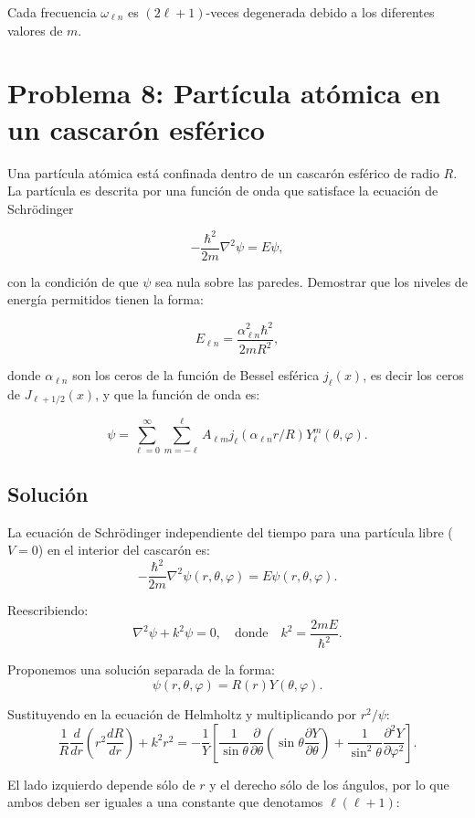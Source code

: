 \documentclass[a4paper]{article}
\begin{document}
Cada frecuencia $\omega_{\ell n}$ es $(2\ell+1)$-veces degenerada debido a los diferentes valores de $m$.


\section{Problema 8: Partícula atómica en un cascarón esférico}

Una partícula atómica está confinada dentro de un cascarón esférico de radio $R$. La partícula es descrita por una función de onda que satisface la ecuación de Schrödinger


$$-\frac{\hbar^2}{2m}\nabla^2\psi = E\psi,$$


con la condición de que $\psi$ sea nula sobre las paredes. Demostrar que los niveles de energía permitidos tienen la forma:


$$E_{\ell n} = \frac{\alpha_{\ell n}^2\hbar^2}{2mR^2},$$


donde $\alpha_{\ell n}$ son los ceros de la función de Bessel esférica $j_\ell(x)$, es decir los ceros de $J_{\ell+1/2}(x)$, y que la función de onda es:


$$\psi = \sum_{\ell=0}^{\infty}\sum_{m=-\ell}^{\ell} A_{\ell m} j_\ell(\alpha_{\ell n}r/R) Y_{\ell}^m(\theta, \varphi).$$


\subsection{Solución}

La ecuación de Schrödinger independiente del tiempo para una partícula libre ($V=0$) en el interior del cascarón es:
$$-\frac{\hbar^2}{2m}\nabla^2\psi(r,\theta,\varphi) = E\psi(r,\theta,\varphi).$$

Reescribiendo:
$$\nabla^2\psi + k^2\psi = 0, \quad \text{donde} \quad k^2 = \frac{2mE}{\hbar^2}.$$

Proponemos una solución separada de la forma:
$$\psi(r,\theta,\varphi) = R(r)Y(\theta,\varphi).$$

Sustituyendo en la ecuación de Helmholtz y multiplicando por $r^2/\psi$:
$$\frac{1}{R}\frac{d}{dr}\left(r^2\frac{dR}{dr}\right) + k^2r^2 = -\frac{1}{Y}\left[\frac{1}{\sin\theta}\frac{\partial}{\partial\theta}\left(\sin\theta\frac{\partial Y}{\partial\theta}\right) + \frac{1}{\sin^2\theta}\frac{\partial^2 Y}{\partial\varphi^2}\right].$$

El lado izquierdo depende sólo de $r$ y el derecho sólo de los ángulos, por lo que ambos deben ser iguales a una constante que denotamos $\ell(\ell+1)$:
\end{document}
